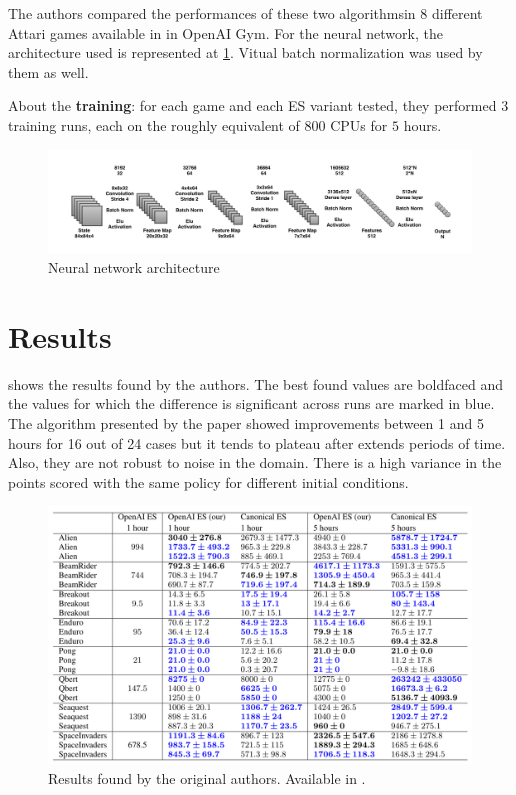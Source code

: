 \documentclass[10pt]{article} %
\begin{document}
The authors compared the performances of these two algorithmsin $8$ different Attari games available in in OpenAI Gym. For the neural network, the architecture used is represented at \cref{fig:nn}. Vitual batch normalization was used by them as well.

About the \textbf{training}: for each game and each ES variant tested, they performed $3$ training runs, each on the roughly equivalent of $800$ CPUs for $5$ hours.

\begin{figure}[ht]
	\begin{center}
		\includegraphics[width=1\columnwidth]{figures/nn.png}
	\end{center}
	\caption{Neural network architecture}
	\label{fig:nn}
\end{figure}

\section{Results}
  shows the results found by the authors. The best found values are boldfaced and the values for which the difference is significant across runs  are marked in blue. The algorithm presented by the paper showed improvements between 1 and 5 hours for 16 out of 24 cases but it tends to plateau after extends periods of time. Also, they are not robust to noise in the domain. There is a high variance in the points scored with the same policy for different initial conditions.

\begin{figure}[ht]
	\begin{center}
		\includegraphics[width=1\columnwidth]{figures/results_table.png}
	\end{center}
	\caption{Results found by the original authors. Available in \cite{DBLP:journals/corr/abs-1802-08842}.}
	\label{fig:regions}
\end{figure}
\end{document}
